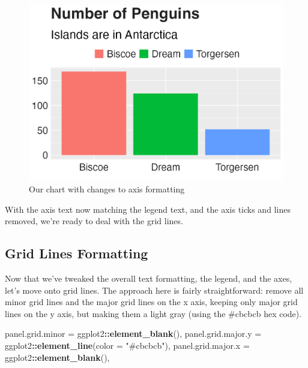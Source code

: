 \documentclass[
]{book}
\newenvironment{Shaded}{\begin{snugshade}}{\end{snugshade}}
\newcommand{\AttributeTok}[1]{\textcolor[rgb]{0.13,0.29,0.53}{#1}}
\newcommand{\FunctionTok}[1]{\textcolor[rgb]{0.13,0.29,0.53}{\textbf{#1}}}
\newcommand{\NormalTok}[1]{#1}
\newcommand{\OtherTok}[1]{\textcolor[rgb]{0.56,0.35,0.01}{#1}}
\newcommand{\SpecialCharTok}[1]{\textcolor[rgb]{0.81,0.36,0.00}{\textbf{#1}}}
\newcommand{\StringTok}[1]{\textcolor[rgb]{0.31,0.60,0.02}{#1}}
\begin{document}
\begin{figure}
\includegraphics[width=1\linewidth]{custom-theme_files/figure-latex/penguins-plot-axes-plot-1} \caption{Our chart with changes to axis formatting}\label{fig:penguins-plot-axes-plot}
\end{figure}

With the axis text now matching the legend text, and the axis ticks and lines removed, we're ready to deal with the grid lines.

\hypertarget{grid-lines-formatting}{%
\subsection*{Grid Lines Formatting}\label{grid-lines-formatting}}

Now that we've tweaked the overall text formatting, the legend, and the axes, let's move onto grid lines. The approach here is fairly straightforward: remove all minor grid lines and the major grid lines on the x axis, keeping only major grid lines on the y axis, but making them a light gray (using the \#cbcbcb hex code).

\begin{Shaded}
\begin{Highlighting}[]
\NormalTok{panel.grid.minor }\OtherTok{=}\NormalTok{ ggplot2}\SpecialCharTok{::}\FunctionTok{element\_blank}\NormalTok{(),}
\NormalTok{panel.grid.major.y }\OtherTok{=}\NormalTok{ ggplot2}\SpecialCharTok{::}\FunctionTok{element\_line}\NormalTok{(}\AttributeTok{color =} \StringTok{"\#cbcbcb"}\NormalTok{),}
\NormalTok{panel.grid.major.x }\OtherTok{=}\NormalTok{ ggplot2}\SpecialCharTok{::}\FunctionTok{element\_blank}\NormalTok{(),}
\end{Highlighting}
\end{Shaded}
\end{document}
